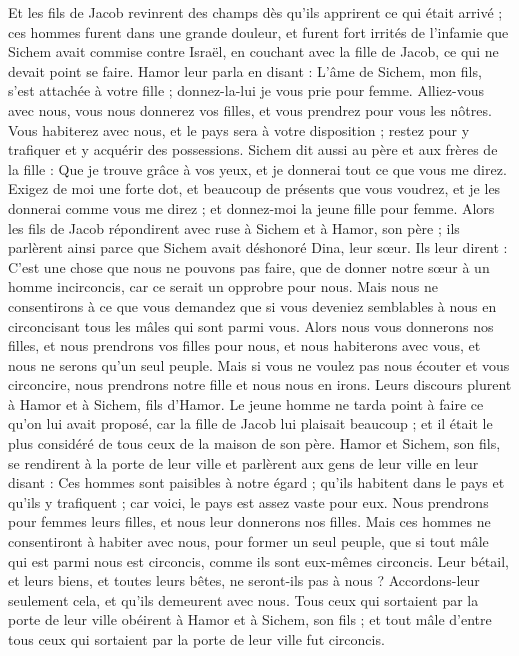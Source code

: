 \begin{multicols}{2}
Et les fils de Jacob revinrent des champs dès qu'ils apprirent ce qui était arrivé ; ces hommes furent dans une grande douleur, et furent fort irrités de l'infamie que Sichem avait commise contre Israël, en couchant avec la fille de Jacob, ce qui ne devait point se faire.
Hamor leur parla en disant : L'âme de Sichem, mon fils, s'est attachée à votre fille ; donnez-la-lui je vous prie pour femme.
Alliez-vous avec nous, vous nous donnerez vos filles, et vous prendrez pour vous les nôtres.
Vous habiterez avec nous, et le pays sera à votre disposition ; restez pour y trafiquer et y acquérir des possessions.
Sichem dit aussi au père et aux frères de la fille : Que je trouve grâce à vos yeux, et je donnerai tout ce que vous me direz.
Exigez de moi une forte dot, et beaucoup de présents que vous voudrez, et je les donnerai comme vous me direz ; et donnez-moi la jeune fille pour femme.
Alors les fils de Jacob répondirent avec ruse à Sichem et à Hamor, son père ; ils parlèrent ainsi parce que Sichem avait déshonoré Dina, leur sœur.
Ils leur dirent : C'est une chose que nous ne pouvons pas faire, que de donner notre sœur à un homme incirconcis, car ce serait un opprobre pour nous.
Mais nous ne consentirons à ce que vous demandez que si vous deveniez semblables à nous en circoncisant tous les mâles qui sont parmi vous.
Alors nous vous donnerons nos filles, et nous prendrons vos filles pour nous, et nous habiterons avec vous, et nous ne serons qu'un seul peuple.
Mais si vous ne voulez pas nous écouter et vous circoncire, nous prendrons notre fille et nous nous en irons.
Leurs discours plurent à Hamor et à Sichem, fils d'Hamor.
Le jeune homme ne tarda point à faire ce qu'on lui avait proposé, car la fille de Jacob lui plaisait beaucoup ; et il était le plus considéré de tous ceux de la maison de son père.
Hamor et Sichem, son fils, se rendirent à la porte de leur ville et parlèrent aux gens de leur ville en leur disant :
Ces hommes sont paisibles à notre égard ; qu'ils habitent dans le pays et qu'ils y trafiquent ; car voici, le pays est assez vaste pour eux. Nous prendrons pour femmes leurs filles, et nous leur donnerons nos filles.
Mais ces hommes ne consentiront à habiter avec nous, pour former un seul peuple, que si tout mâle qui est parmi nous est circoncis, comme ils sont eux-mêmes circoncis.
Leur bétail, et leurs biens, et toutes leurs bêtes, ne seront-ils pas à nous ? Accordons-leur seulement cela, et qu'ils demeurent avec nous.
Tous ceux qui sortaient par la porte de leur ville obéirent à Hamor et à Sichem, son fils ; et tout mâle d'entre tous ceux qui sortaient par la porte de leur ville fut circoncis.

\end{multicols}
